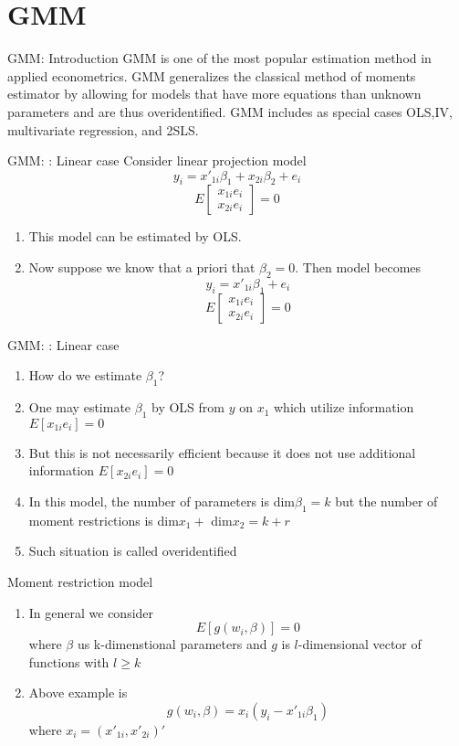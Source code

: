 \documentclass{beamer}
\begin{document}
\section{GMM}
\begin{frame}{GMM: Introduction}
	GMM is one of the most popular estimation method in applied econometrics. GMM generalizes the classical method of moments estimator by allowing for models that have more equations than unknown parameters and are thus overidentified. GMM includes as special cases OLS,IV, multivariate regression, and 2SLS.  
\end{frame}
\begin{frame}{GMM: : Linear case}
	Consider linear projection model
	\[y_i = x'_{1i} \beta_1 + x_{2i} \beta_2 + e_i\]
	\[E\begin{bmatrix}
		x_{1i} e_i \\	
		x_{2i} e_i
		\end{bmatrix} =0
		\]
	\begin{enumerate}
		\item This model can be estimated by OLS.
		\item Now suppose we know that a priori that $\beta_2=0$. Then model becomes 
			\[y_i = x'_{1i} \beta_1 + e_i\]
			\[E \begin{bmatrix}
				x_{1i} e_i \\	
				x_{2i} e_i
				\end{bmatrix}
				=0\]
	\end{enumerate}
\end{frame}
\begin{frame}{GMM: : Linear case}
	\begin{enumerate}
			\item How do we estimate $\beta_1$?
			\item One may estimate $\beta_1$ by OLS from $y$ on $x_1$ which utilize information $E[x_{1i} e_i] = 0$
			\item But this is not necessarily efficient because it does not use additional information $E[x_{2i} e_i]=0$
			\item In this model, the number of parameters is dim$\beta_1 = k$ but the number of moment restrictions is dim$x_1+$ dim$x_2 = k+r$ 
			\item Such situation is called overidentified
	\end{enumerate}
\end{frame}
\begin{frame}{Moment restriction model}
	\begin{enumerate}
\item In general we consider	
\[E[g(w_i,\beta)]=0\]
where $\beta$ us k-dimenstional parameters and $g$ is $l$-dimensional vector of functions with $l \geq k$ 
\item Above example is 
	\[g(w_i,\beta) = x_i(y_i - x'_{1i} \beta_1)\]
	where $x_i = (x'_{1i}, x'_{2i})'$
\end{enumerate}
\end{frame}
\end{document}

